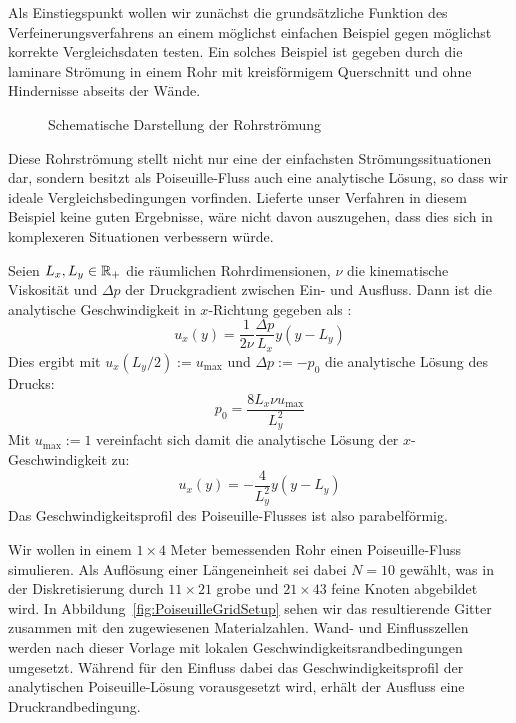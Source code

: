 Als Einstiegspunkt wollen wir zunächst die grundsätzliche Funktion des Verfeinerungsverfahrens an einem möglichst einfachen Beispiel gegen möglichst korrekte Vergleichsdaten testen. Ein solches Beispiel ist gegeben durch die laminare Strömung in einem Rohr mit kreisförmigem Querschnitt und ohne Hindernisse abseits der Wände.

\begin{figure}[h]
\centering

\caption{Schematische Darstellung der Rohrströmung}
\label{fig:PoiseuilleOverview}
\end{figure}

Diese Rohrströmung stellt nicht nur eine der einfachsten Strömungssituationen dar, sondern besitzt als Poiseuille-Fluss auch eine analytische Lösung, so dass wir ideale Vergleichsbedingungen vorfinden. Lieferte unser Verfahren in diesem Beispiel keine guten Ergebnisse, wäre nicht davon auszugehen, dass dies sich in komplexeren Situationen verbessern würde.

\begin{Definition}
\label{def:analyticPoiseuille}
Seien \(L_x, L_y \in \mathbb{R}_+\) die räumlichen Rohrdimensionen, \(\nu\) die kinematische Viskosität und \(\Delta p\) der Druckgradient zwischen Ein- und Ausfluss. Dann ist die analytische Geschwindigkeit in \(x\)-Richtung gegeben als \cite[vgl.~Kap.~4]{Bao11}:
\[u_x(y) = \frac{1}{2\nu} \frac{\Delta p}{L_x} y (y-L_y)\]
Dies ergibt mit \(u_x(L_y/2):=u_\text{max}\) und \(\Delta p := -p_0\) die analytische Lösung des Drucks:
\[p_0 = \frac{8 L_x \nu u_\text{max} }{L_y^2}\]
Mit \(u_\text{max}:=1\) vereinfacht sich damit die analytische Lösung der \(x\)-Geschwindigkeit zu:
\[u_x(y) = -\frac{4}{L_y^2} y (y-L_y)\]
Das Geschwindigkeitsprofil des Poiseuille-Flusses ist also parabelförmig.
\end{Definition}

Wir wollen in einem \(1 \times 4\) Meter bemessenden Rohr einen Poiseuille-Fluss simulieren. Als Auflösung einer Längeneinheit sei dabei \(N=10\) gewählt, was in der Diskretisierung durch \(11 \times 21\) grobe und \(21 \times 43\) feine Knoten abgebildet wird.
In Abbildung~\ref{fig:PoiseuilleGridSetup} sehen wir das resultierende Gitter zusammen mit den zugewiesenen Materialzahlen. Wand- und Einflusszellen werden nach dieser Vorlage mit lokalen Geschwindigkeitsrandbedingungen umgesetzt. Während für den Einfluss dabei das Geschwindigkeitsprofil der analytischen Poiseuille-Lösung vorausgesetzt wird, erhält der Ausfluss eine Druckrandbedingung.

